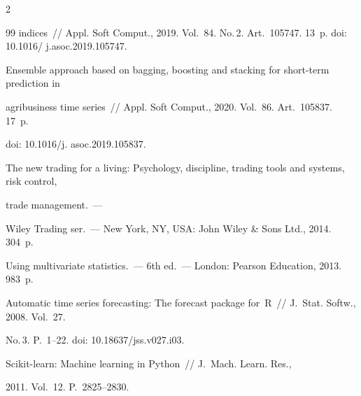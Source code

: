 \begin{multicols}{2}
{{\begin{thebibliography}{99}
indices~//  Appl. Soft Comput., 2019. Vol.~84. No.\,2. Art.~105747. 13~p. doi: 10.1016/ j.asoc.2019.105747.





Ensemble approach based on bagging, boosting and stacking for short-term prediction in 

agribusiness time series~// Appl. Soft Comput., 2020. Vol.~86. Art.~105837. 17~p.

 doi: 10.1016/j. asoc.2019.105837.











The new trading for a living: Psychology, discipline, trading tools and systems, risk control, 

trade management.~--- 

Wiley Trading ser.~--- New York, NY, USA: John Wiley \& Sons Ltd., 2014. 304~p.





 Using multivariate statistics.~--- 6th ed.~--- London: Pearson Education, 2013. 983~p.







Automatic time series forecasting: The forecast package for~R~// J.~Stat. Softw., 2008. Vol.~27. 

No.\,3. P.~1--22. doi: 10.18637/jss.v027.i03.




 Scikit-learn: Machine learning in Python~// J.~Mach. Learn. Res., 

2011. Vol.~12. P.~2825--2830. %







\end{thebibliography}}}
\end{multicols}
